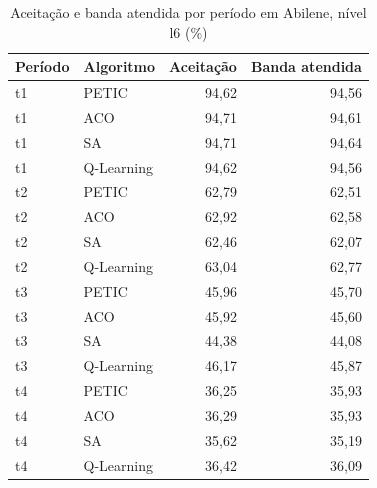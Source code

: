 \begin{table}[htb]
    \centering
    \scriptsize
    \caption{Aceitação e banda atendida por período em Abilene, nível l6 (\%)}
    \label{tab:periodos-abilene-l6}
    \begin{tabular}{llrr}
        \hline
        Período & Algoritmo & Aceitação & Banda atendida \\
        \hline
        t1 & PETIC & 94,62 & 94,56 \\
        t1 & ACO & 94,71 & 94,61 \\
        t1 & SA & 94,71 & 94,64 \\
        t1 & Q-Learning & 94,62 & 94,56 \\
        t2 & PETIC & 62,79 & 62,51 \\
        t2 & ACO & 62,92 & 62,58 \\
        t2 & SA & 62,46 & 62,07 \\
        t2 & Q-Learning & 63,04 & 62,77 \\
        t3 & PETIC & 45,96 & 45,70 \\
        t3 & ACO & 45,92 & 45,60 \\
        t3 & SA & 44,38 & 44,08 \\
        t3 & Q-Learning & 46,17 & 45,87 \\
        t4 & PETIC & 36,25 & 35,93 \\
        t4 & ACO & 36,29 & 35,93 \\
        t4 & SA & 35,62 & 35,19 \\
        t4 & Q-Learning & 36,42 & 36,09 \\
        \hline
    \end{tabular}
\end{table}
